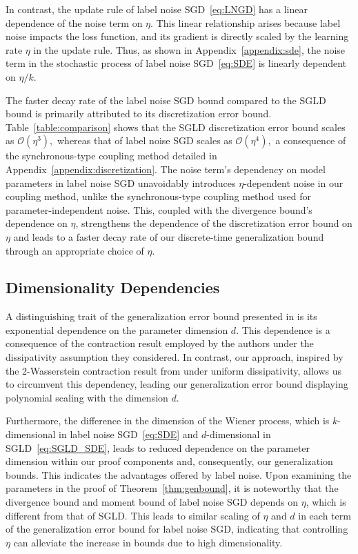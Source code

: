 \documentclass{article}
\begin{document}
In contrast, the update rule of label noise SGD~\eqref{eq:LNGD} has a linear dependence of the noise term on $\eta$. This linear relationship arises because label noise impacts the loss function, and its gradient is directly scaled by the learning rate $\eta$ in the update rule. Thus, as shown in Appendix~\ref{appendix:sde}, the noise term in the stochastic process of label noise SGD~\eqref{eq:SDE} is linearly dependent on $\eta/k$. 

The faster decay rate of the label noise SGD bound compared to the SGLD bound is primarily attributed to its discretization error bound. Table~\ref{table:comparison} shows that the SGLD discretization error bound scales as $\mathcal{O}(\eta^3),$ whereas that of label noise SGD scales as $\mathcal{O}(\eta^4),$ a consequence of the synchronous-type coupling method detailed in Appendix~\ref{appendix:discretization}.
The noise term's dependency on model parameters in label noise SGD unavoidably introduces $\eta$-dependent noise in our coupling method, unlike the synchronous-type coupling method used for parameter-independent noise. This, coupled with the divergence bound's dependence on $\eta$, strengthens the dependence of the discretization error bound on $\eta$ and leads to a faster decay rate of our discrete-time generalization bound through an appropriate choice of $\eta$.

\subsection{Dimensionality Dependencies}
A distinguishing trait of the generalization error bound presented in \citet{Farghly} is its exponential dependence on the parameter dimension $d$. This dependence is a consequence of the contraction result employed by the authors under the dissipativity assumption they considered. In contrast, our approach, inspired by the 2-Wasserstein contraction result from \citet{Wang} under uniform dissipativity, allows us to circumvent this dependency, leading our generalization error bound displaying polynomial scaling with the dimension $d$.

Furthermore, the difference in the dimension of the Wiener process, which is $k$-dimensional in label noise SGD~\eqref{eq:SDE} and $d$-dimensional in SGLD~\eqref{eq:SGLD_SDE}, leads to reduced dependence on the parameter dimension within our proof components and, consequently, our generalization bounds. This indicates the advantages offered by label noise. Upon examining the parameters in the proof of Theorem~\ref{thm:genbound}, it is noteworthy that the divergence bound and moment bound of label noise SGD depends on $\eta$, which is different from that of SGLD. This leads to similar scaling of $\eta$ and $d$ in each term of the generalization error bound for label noise SGD, indicating that controlling $\eta$ can alleviate the increase in bounds due to high dimensionality.
\end{document}
